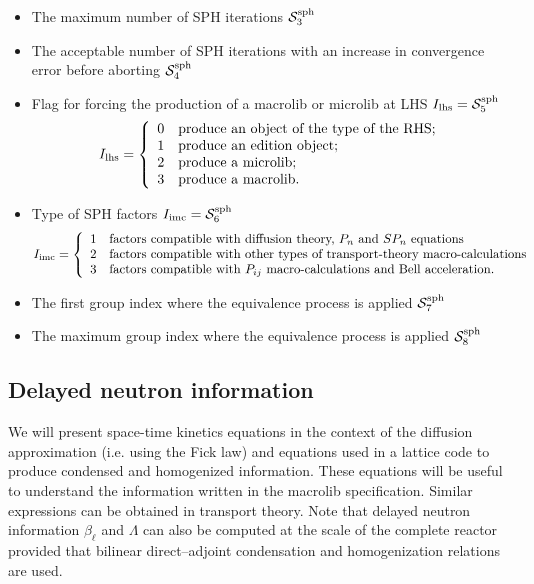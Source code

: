 \begin{itemize}
\item The maximum number of SPH iterations $\mathcal{S}^{\rm sph}_{3}$ 

\item The acceptable number of SPH iterations with an increase in convergence error before aborting $\mathcal{S}^{\rm sph}_{4}$

\item Flag for forcing the production of a macrolib or microlib at LHS $I_{\rm lhs} = \mathcal{S}^{\rm sph}_{5}$
\begin{displaymath}
I_{\rm lhs} = \left\{
\begin{array}{ll}
0 & \textrm{produce an object of the type of the RHS;} \\
1 & \textrm{produce an edition object;} \\
2 & \textrm{produce a microlib;} \\
3 & \textrm{produce a macrolib.}
\end{array} \right.
\end{displaymath}

\item Type of SPH factors $I_{\rm imc} = \mathcal{S}^{\rm sph}_{6}$
\begin{displaymath}
I_{\rm imc} = \left\{
\begin{array}{ll}
1 & \textrm{factors compatible with diffusion theory, $P_n$ and $SP_n$ equations} \\
2 & \textrm{factors compatible with other types of transport-theory macro-calculations} \\
3 & \textrm{factors compatible with $P_{ij}$ macro-calculations and Bell acceleration.} \\
\end{array} \right.
\end{displaymath}

\item The first group index where the equivalence process is applied $\mathcal{S}^{\rm sph}_{7}$ 

\item The maximum group index where the equivalence process is applied $\mathcal{S}^{\rm sph}_{8}$ 

\end{itemize}

\subsection{Delayed neutron information}

We will present space-time kinetics equations in the context of the diffusion
approximation (i.e. using the Fick law) and equations used in a lattice code
to produce condensed and homogenized information. These equations will be useful to understand the
information written in the {\sc macrolib} specification. Similar expressions can
be obtained in transport theory. Note that delayed neutron information
$\beta_\ell$ and $\Lambda$ can also be computed at the scale of the complete reactor
provided that bilinear direct--adjoint condensation and homogenization relations
are used.


